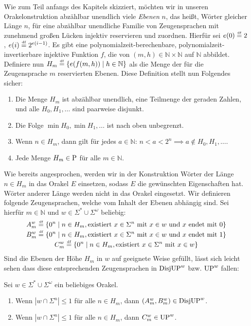 Wie zum Teil anfangs des Kapitels skizziert, möchten wir in unseren Orakelonstruktion abzählbar unendlich viele \emph{Ebenen} $n$, das heißt, Wörter gleicher Länge $n$, für eine abzählbar unendliche Familie von Zeugensprachen mit zunehmend großen Lücken injektiv reservieren und zuordnen.
Hierfür sei $e(0) \defeq 2$, $e(i) \defeq 2^{e(i-1)}$.
Es gibt eine polynomialzeit-berechenbare, polynomialzeit-invertierbare injektive Funktion $f$, die von $(m,h)\in\mathbb N\times\mathbb N$ auf $\mathbb N$ abbildet.
Definiere nun $H_m \defeq \{ e(f(m,h)) \mid h\in\mathbb N \}$ als die Menge der für die Zeugensprache $m$ reservierten Ebenen.
Diese Definition stellt nun Folgendes sicher:
\begin{observation}\label{obs:leveldefinitions}
    \begin{enumerate}
        \item Die Menge $H_m$ ist abzählbar unendlich, eine Teilmenge der geraden Zahlen, und alle $H_0, H_1, \dots$ sind paarweise disjunkt.
        \item Die Folge $\min H_0, \min H_1, \dots$ ist nach oben unbegrenzt.
        \item Wenn $n\in H_m$, dann gilt für jedes $a\in\mathbb N$: $n<a<2^{n} \implies a\not\in H_0, H_1, \dots$.
        \item Jede Menge $H_m\in \P$ für alle $m\in\mathbb N$.
    \end{enumerate}
\end{observation}


Wie bereits angesprochen, werden wir in der Konstruktion Wörter der Länge $n\in H_m$ in das Orakel $E$ einsetzen, sodass $E$ die gewünschten Eigenschaften hat.
Wörter anderer Länge werden nicht in das Orakel eingesetzt.
Wir definieren folgende Zeugensprachen, welche vom Inhalt der Ebenen abhängig sind. Sei hierfür $m\in\mathbb N$ und $w\in\Sigma^*\cup\Sigma^{\omega}$ beliebig:
\begin{gather*}
    A_m^w \defeq \{ 0^n \mid n\in H_m, \text{existiert $x\in \Sigma^{n}$ mit } x\in w \text{ und $x$ endet mit $0$} \}\\
    B_m^w \defeq \{ 0^n \mid n\in H_m, \text{existiert $x\in \Sigma^{n}$ mit } x\in w \text{ und $x$ endet mit $1$} \}\\
    C_m^w \defeq \{ 0^n \mid n\in H_m, \text{existiert $x\in \Sigma^{n}$ mit } x\in w  \}
\end{gather*}
Sind die Ebenen der Höhe $H_m$ in $w$ auf geeignete Weise gefüllt, lässt sich leicht sehen dass diese entsprechenden Zeugensprachen in $\DisjUP^w$ bzw. $\UP^w$ fallen:
\begin{claim}\label{claim:witnesslanguages}
    Sei $w\in\Sigma^*\cup\Sigma^\omega$ ein beliebiges Orakel.
    \begin{enumerate}
        \item Wenn $|w\cap \Sigma^{n}|\leq 1$ für alle $n\in H_m$, dann $(A_m^w, B_m^w)\in\DisjUP^w$.
        \item Wenn $|w\cap \Sigma^n|\leq 1$ für alle $n\in H_m$, dann $C_m^w \in \UP^w$.
    \end{enumerate}
\end{claim}

